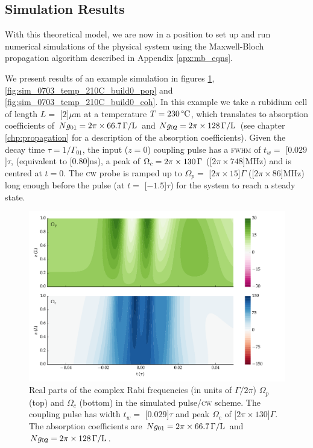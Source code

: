   \subsection{Simulation Results}

    With this theoretical model, we are now in a position to set up and run
    numerical simulations of the physical system using the Maxwell-Bloch
    propagation algorithm described in Appendix \ref{apx:mb_eqns}.

    We present results of an example simulation in figures
    \ref{fig:sim_0703_temp_210C_build0_fields},
    \ref{fig:sim_0703_temp_210C_build0_pop} and
    \ref{fig:sim_0703_temp_210C_build0_coh}. In this example we take a rubidium
    cell of length $L = $ \unit[$2$]{$\mu$m} at a temperature $T =
    \unit[230]{\textrm{\textdegree C}}$, which translates to absorption
    coefficients of $Ng_{01} = \unit[2\pi\times66.7]{\Gamma/L}$ and $Ng_{02} =
    \unit[2\pi\times128]{\Gamma/L}$ (see chapter \ref{chp:propagation} for a
    description of the absorption coefficients). Given the decay time $\tau =
    1/\Gamma_{01}$, the input ($z\!=\!0$) coupling pulse has a \textsc{fwhm} of
    $t_w = $ \unit[$0.029$]{$\tau$}, (equivalent to \unit[$0.80$]{ns}), a peak
    of $\Omega_c = \unit[2\pi\times130]{\Gamma}$ (\unit[$2\pi\times748$]{MHz})
    and is centred at $t\!=\!0$. The \textsc{cw} probe is ramped up to $\Omega_p
    = $ \unit[$2\pi\times15$]{$\Gamma$} (\unit[$2\pi\times86$]{MHz}) long enough
    before the pulse (at $t = $ \unit[$-1.5$]{$\tau$}) for the system to reach a
    steady state.

    \begin{figure}[h]
      \includegraphics[width=\linewidth]
        {figs/06_simultons/mb_vee2g_build0_15c_130p_0330t_230C_sb50_120vel000_00_002um_fig2.pdf}
      \caption{
      Real parts of the complex Rabi frequencies (in units of $\Gamma/2\pi$)
      $\Omega_{p}$ (top) and $\Omega_{c}$ (bottom)  in the simulated
      pulse/\textsc{cw} scheme. The coupling pulse has width $t_w = $
      \unit[$0.029$]{$\tau$} and peak $\Omega_c$ of \unit[$2\pi\times130$]{$\Gamma$}.
      The absorption coefficients are $Ng_{01} = \unit[2\pi\times66.7]{\Gamma/L}$ and
      $Ng_{02} = \unit[2\pi\times128]{\Gamma/L}$.
      }
      \label{fig:sim_0703_temp_210C_build0_fields}
    \end{figure}

